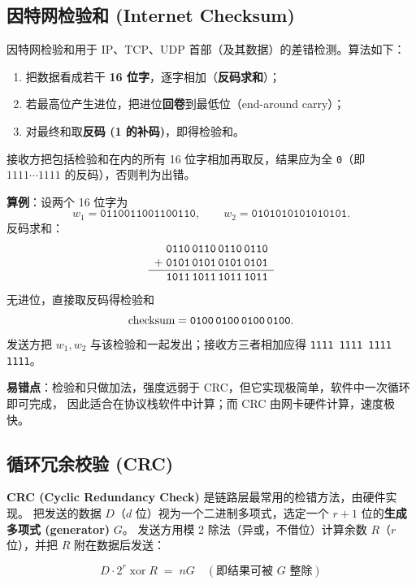 \subsection{因特网检验和 (Internet Checksum)}

因特网检验和用于 IP、TCP、UDP 首部（及其数据）的差错检测。算法如下：

\begin{enumerate}
    \item 把数据看成若干 \textbf{16 位字}，逐字相加（\textbf{反码求和}）；
    \item 若最高位产生进位，把进位\textbf{回卷}到最低位（end-around carry）；
    \item 对最终和取\textbf{反码 (1 的补码)}，即得检验和。
\end{enumerate}

接收方把包括检验和在内的所有 16 位字相加再取反，结果应为全 \texttt{0}（即 $1111\cdots1111$ 的反码），否则判为出错。

\noindent\textbf{算例}：设两个 16 位字为
\[
w_1 = \texttt{0110011001100110},\qquad w_2 = \texttt{0101010101010101}.
\]
反码求和：
\[
\begin{array}{r@{\;}l}
  & \texttt{0110\,0110\,0110\,0110}\\
+ & \texttt{0101\,0101\,0101\,0101}\\
\hline
  & \texttt{1011\,1011\,1011\,1011}
\end{array}
\]
无进位，直接取反码得检验和
\[
\text{checksum} = \texttt{0100\,0100\,0100\,0100}.
\]
发送方把 $w_1,w_2$ 与该检验和一起发出；接收方三者相加应得 \texttt{1111\,1111\,1111\,1111}。

\noindent\textbf{易错点}：检验和只做加法，强度远弱于 CRC，但它实现极简单，软件中一次循环即可完成，
因此适合在协议栈软件中计算；而 CRC 由网卡硬件计算，速度极快。

\subsection{循环冗余校验 (CRC)}

\textbf{CRC (Cyclic Redundancy Check)} 是链路层最常用的检错方法，由硬件实现。
把发送的数据 $D$（$d$ 位）视为一个二进制多项式，选定一个 $r+1$ 位的\textbf{生成多项式 (generator)} $G$。
发送方用模 2 除法（异或，不借位）计算余数 $R$（$r$ 位），并把 $R$ 附在数据后发送：

\begin{equation}
    D \cdot 2^{r} \;\text{xor}\; R \;=\; nG \quad(\text{即结果可被 } G \text{ 整除})
    \label{eq:crc}
\end{equation}

